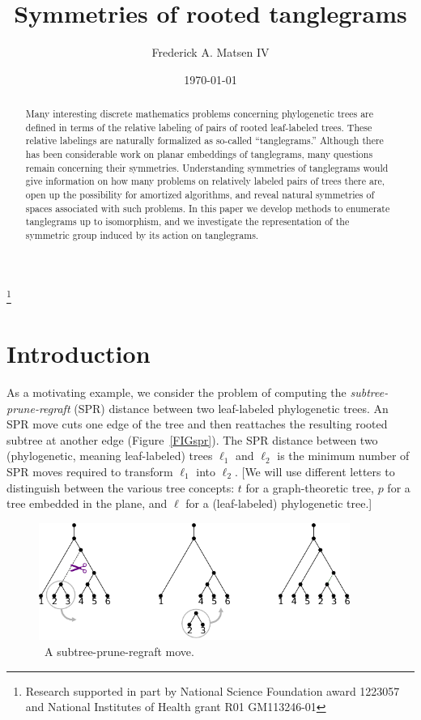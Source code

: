 \documentclass{amsart}
\newcommand{\arxiv}[1]{#1}
\newcommand{\FIGspr}{\
\label{FIGspr}
\begin{figure}
  \arxiv{\includegraphics[width=4in]{figures/spr-definition}}
\caption{\
  A subtree-prune-regraft move.
}
\end{figure}
}
\begin{document}
\title{Symmetries of rooted tanglegrams}
\author[Matsen]{Frederick A. Matsen IV}
\address{Fred Hutchinson Cancer Research Center \\ Seattle, WA}
\thanks{Research supported in part by National Science Foundation award 1223057 and National Institutes of Health grant R01 GM113246-01}


\date{\today}

\begin{abstract}
Many interesting discrete mathematics problems concerning phylogenetic trees are defined in terms of the relative labeling of pairs of rooted leaf-labeled trees.
These relative labelings are naturally formalized as so-called ``tanglegrams.''
Although there has been considerable work on planar embeddings of tanglegrams, many questions remain concerning their symmetries.
Understanding symmetries of tanglegrams would give information on how many problems on relatively labeled pairs of trees there are, open up the possibility for amortized algorithms, and reveal natural symmetries of spaces associated with such problems.
In this paper we develop methods to enumerate tanglegrams up to isomorphism, and we investigate the representation of the symmetric group induced by its action on tanglegrams.
\end{abstract}

\maketitle


\section{Introduction}
As a motivating example, we consider the problem of computing the \emph{subtree-prune-regraft} (SPR) distance between two leaf-labeled phylogenetic trees.
An SPR move cuts one edge of the tree and then reattaches the resulting rooted subtree at another edge (Figure~\ref{FIGspr}).
The SPR distance between two (phylogenetic, meaning leaf-labeled) trees $\ell_1$ and $\ell_2$ is the minimum number of SPR moves required to transform $\ell_1$ into $\ell_2$.
[We will use different letters to distinguish between the various tree concepts: $t$ for a graph-theoretic tree, $p$ for a tree embedded in the plane, and $\ell$ for a (leaf-labeled) phylogenetic tree.]
\FIGspr
\end{document}
